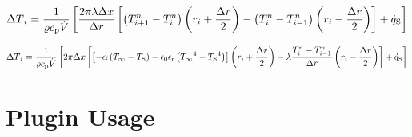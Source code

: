 \documentclass{scrartcl}
\begin{document}
    \begin{equation}
        {\Delta T}_{i} = \frac{1}{{\varrho}{c_\mathrm{p}}{\dot{V}}}
        \left[
            \frac{2 \pi {\lambda} {\Delta x}}{{\Delta r}} \left[
            \left( {T}_{{i}+1}^{n} - {T}_{i}^{n} \right)
                \left( {r}_{i} + \frac{{\Delta r}}{2} \right)
            -\left( {T}_{{i}}^{n} - {T}_{{i}-1}^{n} \right)
            \left( {r}_{i} - \frac{{\Delta r}}{2} \right)
            \right]
        + {\dot{q}_\mathrm{S}}
        \right]
        \label{eq:increment_layer}
    \end{equation}

    \begin{equation}
        {\Delta T}_{\hat{\imath}} = \frac{1}{{\varrho}{c_\mathrm{p}}{\dot{V}}}
        \left[
         2 \pi {\Delta x} \left[
            \left[ -{\alpha} \left( {T_\infty} - {T_\mathrm{S}} \right) - {\epsilon_0}{\epsilon_\mathrm{r}}\left( {T_\infty}^4 - {T_\mathrm{S}}^4 \right) \right]
            \left( {r}_{i} + \frac{{\Delta r}}{2} \right)
            -{\lambda} \frac{{T}_{{i}}^{n} - {T}_{{i}-1}^{n}}{{\Delta r}}
            \left( {r}_{i} - \frac{{\Delta r}}{2} \right)
            \right]
        + {\dot{q}_\mathrm{S}}
        \right]
        \label{eq:increment_surface}
    \end{equation}


    \section{Plugin Usage}\label{sec:plugin-usage}

    

    \printbibliography
\end{document}
